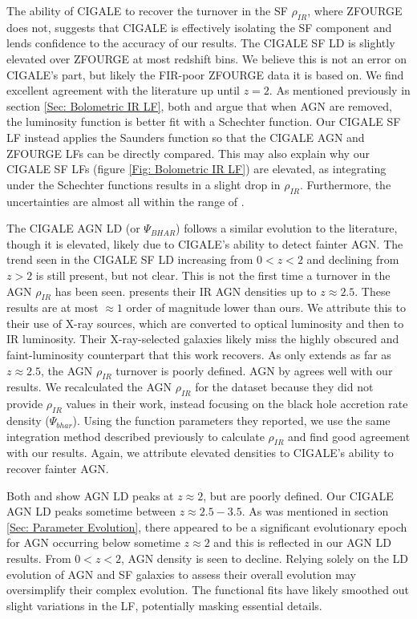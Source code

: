 The ability of CIGALE to recover the turnover in the SF $\rho_{IR}$, where ZFOURGE does not, suggests that CIGALE is effectively isolating the SF component and lends confidence to the accuracy of our results. The CIGALE SF LD is slightly elevated over ZFOURGE at most redshift bins. We believe this is not an error on CIGALE's part, but likely the FIR-poor ZFOURGE data it is based on. We find excellent agreement with the literature up until $z=2$. As mentioned previously in section \ref{Sec: Bolometric IR LF}, both \cite{fu_decomposing_2010} and \cite{wu_mid-infrared_2011} argue that when AGN are removed, the luminosity function is better fit with a Schechter function. Our CIGALE SF LF instead applies the Saunders function so that the CIGALE AGN and ZFOURGE LFs can be directly compared. This may also explain why our CIGALE SF LFs (figure \ref{Fig: Bolometric IR LF}) are elevated, as integrating under the Schechter functions results in a slight drop in $\rho_{IR}$. Furthermore, the uncertainties are almost all within the range of \cite{madau_cosmic_2014}.

The CIGALE AGN LD (or $\Psi_{BHAR}$) follows a similar evolution to the literature, though it is elevated, likely due to CIGALE's ability to detect fainter AGN. The trend seen in the CIGALE SF LD increasing from $0<z<2$ and declining from $z>2$ is still present, but not clear. This is not the first time a turnover in the AGN $\rho_{IR}$ has been seen. \cite{symeonidis_agn_2021} presents their IR AGN densities up to $z\approx2.5$. These results are at most $\approx 1$ order of magnitude lower than ours. We attribute this to their use of \cite{aird_evolution_2015} X-ray sources, which are converted to optical luminosity and then to IR luminosity. Their X-ray-selected galaxies likely miss the highly obscured and faint-luminosity counterpart that this work recovers. As \cite{symeonidis_agn_2021} only extends as far as $z\approx2.5$, the AGN $\rho_{IR}$ turnover is poorly defined. AGN by \cite{delvecchio_tracing_2014} agrees well with our results. We recalculated the AGN $\rho_{IR}$ for the \cite{delvecchio_tracing_2014} dataset because they did not provide $\rho_{IR}$ values in their work, instead focusing on the black hole accretion rate density ($\Psi_{bhar}$). Using the function parameters they reported, we use the same integration method described previously to calculate $\rho_{IR}$ and find good agreement with our results. Again, we attribute elevated densities to CIGALE's ability to recover fainter AGN.

Both \cite{symeonidis_agn_2021} and \cite{delvecchio_tracing_2014} show AGN LD peaks at $z\approx2$, but are poorly defined. Our CIGALE AGN LD peaks sometime between $z\approx2.5-3.5$. As was mentioned in section \ref{Sec: Parameter Evolution}, there appeared to be a significant evolutionary epoch for AGN occurring below sometime $z\approx2$ and this is reflected in our AGN LD results. From $0<z<2$, AGN density is seen to decline. Relying solely on the LD evolution of AGN and SF galaxies to assess their overall evolution may oversimplify their complex evolution. The functional fits have likely smoothed out slight variations in the LF, potentially masking essential details. 